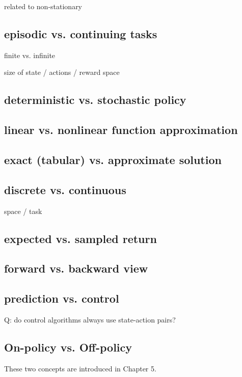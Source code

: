 \documentclass[sutton_barto_notes.tex]{subfiles}
\begin{document}
related to non-stationary

\subsection{episodic vs. continuing tasks}

finite vs. infinite

size of state / actions / reward space

\subsection{deterministic vs. stochastic policy}

\subsection{linear vs. nonlinear function approximation}

\subsection{exact (tabular) vs. approximate solution}

\subsection{discrete vs. continuous}

space / task

\subsection{expected vs. sampled return}

\subsection{forward vs. backward view}

\subsection{prediction vs. control}

Q: do control algorithms always use state-action pairs?

\subsection{On-policy vs. Off-policy}

These two concepts are introduced in Chapter 5.
\end{document}
